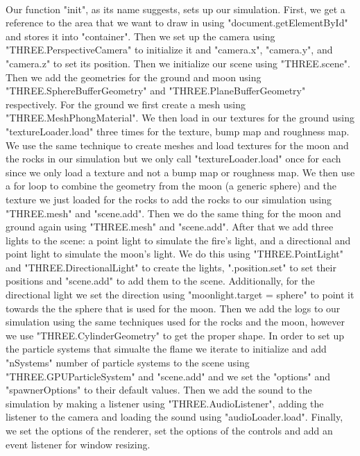 \documentclass[letterpaper]{article}
\begin{document}
\paragraph{}    
    Our function "init", as its name suggests, sets up our simulation. First, we get a reference to the area that we want to draw in using "document.getElementById" and stores it into "container". Then we set up the camera using "THREE.PerspectiveCamera" to initialize it and "camera.x", "camera.y", and "camera.z" to set its position. Then we initialize our scene using "THREE.scene". Then we add the geometries for the ground and moon using "THREE.SphereBufferGeometry" and "THREE.PlaneBufferGeometry" respectively. For the ground we first create a mesh using "THREE.MeshPhongMaterial". We then load in our textures for the ground using "textureLoader.load" three times for the texture, bump map and roughness map. We use the same technique to create meshes and load textures for the moon and the rocks in our simulation but we only call "textureLoader.load" once for each since we only load a texture and not a bump map or roughness map. We then use a for loop to combine the geometry from the moon (a generic sphere) and the texture we just loaded for the rocks to add the rocks to our simulation using "THREE.mesh" and "scene.add". Then we do the same thing for the moon and ground again using "THREE.mesh" and "scene.add". After that we add three lights to the scene: a point light to simulate the fire's light, and a directional and point light to simulate the moon's light. We do this using "THREE.PointLight" and "THREE.DirectionalLight" to create the lights, ".position.set" to set their positions and "scene.add" to add them to the scene. Additionally, for the directional light we set the direction using "moonlight.target = sphere" to point it towards the the sphere that is used for the moon. Then we add the logs to our simulation using the same techniques used for the rocks and the moon, however we use "THREE.CylinderGeometry" to get the proper shape. In order to set up the particle systems that simualte the flame we iterate to initialize and add "nSystems" number of particle systems to the scene using "THREE.GPUParticleSystem" and "scene.add" and we set the "options" and "spawnerOptions" to their default values. Then we add the sound to the simulation by making a listener using "THREE.AudioListener", adding the listener to the camera and loading the sound using "audioLoader.load". Finally, we set the options of the renderer, set the options of the controls and add an event listener for window resizing. 
\end{document}
